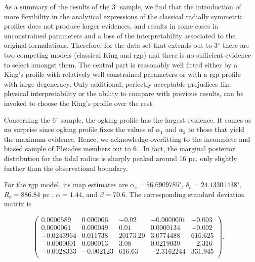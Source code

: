 
As a summary of the results of the 3$^{\circ}$ sample, we find that the introduction of more flexibility in the analytical expressions of the classical radially symmetric profiles does not produce larger evidences, and results in some cases in unconstrained parameters and a loss of the interpretability associated to the original formulations. Therefore, for the data set that extends out to 3$^{\circ}$ there are two competing models (classical King and \gls{rgp}) and there is no sufficient evidence to select amongst them. The central part is reasonably well fitted either by a King's profile with relatively well constrained parameters or with a \gls{rgp} profile with large degeneracy.  Only additional, perfectly acceptable prejudices like physical interpretability or the ability to compare with previous results, can be invoked to choose the King's profile over the rest.


Concerning the 6$^{\circ}$ sample, the \gls{ogking} profile has the largest evidence. It comes as no surprise since \gls{ogking} profile fixes the values of $\alpha_1$ and $\alpha_2$ to those that yield the maximum evidence. Hence, we acknowledge overfitting to the incomplete and biased sample of Pleiades members out to 6$^{\circ}$. In fact, the marginal posterior distribution for the tidal radius is sharply peaked around 16 pc, only slightly further than the observational boundary.

For the \gls{rgp} model, its \gls{map} estimates are $\alpha_c=56.6909785^{\circ}$, $\delta_c=24.13301438^{\circ}$, $R_b=886.84$ pc , $\alpha=1.44$, and $\beta=70.6$. The corresponding standard deviation matrix is

$$
\left(\begin{array}{rrrrr}
 0.0000589  & 0.000006 &   -0.02 &-0.0000001 &  -0.003  \\
 0.0000061 & 0.000049 &    0.01 & 0.0000134 &  -0.002\\
-0.0243964 & 0.011738 &20173.20 & 3.0774488 & 616.625\\
-0.0000001 & 0.000013 &    3.08 & 0.0219039 &  -2.316\\
-0.0028333 &-0.002123 &  616.63 &-2.3162244 & 331.945\\
\end{array}\right).
$$

